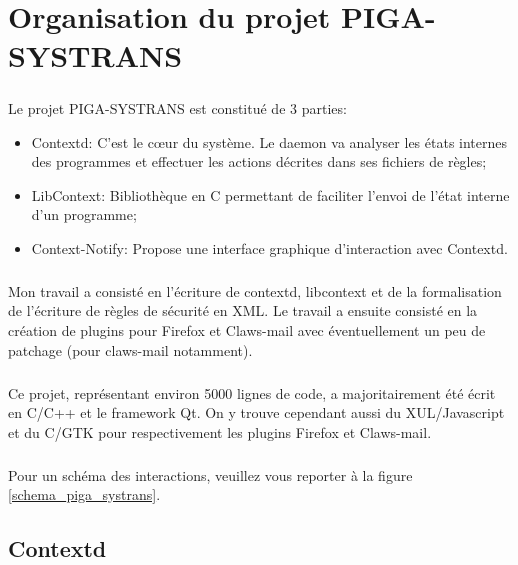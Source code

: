 \appendix
{}
\chapter{Organisation du projet PIGA-SYSTRANS}
	\label{PIGA_SYSTRANS tech}
	
	\paragraph*{}
		Le projet PIGA-SYSTRANS est constitué de 3 parties:
		\begin{itemize}
   			\item Contextd: C'est le cœur du système. Le daemon va analyser les états internes des programmes et effectuer les actions décrites dans ses fichiers de règles;
   			\item LibContext: Bibliothèque en C permettant de faciliter l'envoi de l'état interne d'un programme;
   			\item Context-Notify: Propose une interface graphique d'interaction avec Contextd.
   		\end{itemize}
		
	\paragraph*{}
		Mon travail a consisté en l'écriture de contextd, libcontext et de la formalisation de l'écriture de règles de sécurité en XML. Le travail a ensuite consisté en la création de plugins pour Firefox et Claws-mail avec éventuellement un peu de patchage (pour claws-mail notamment).	
		
	\paragraph*{}
		Ce projet, représentant environ 5000 lignes de code, a majoritairement été écrit en C/C++ et le framework Qt. On y trouve cependant aussi du XUL/Javascript et du C/GTK pour respectivement les plugins Firefox et Claws-mail.


	\paragraph*{}
		Pour un schéma des interactions, veuillez vous reporter à la figure \ref{schema_piga_systrans}.
	
	\section{Contextd}
